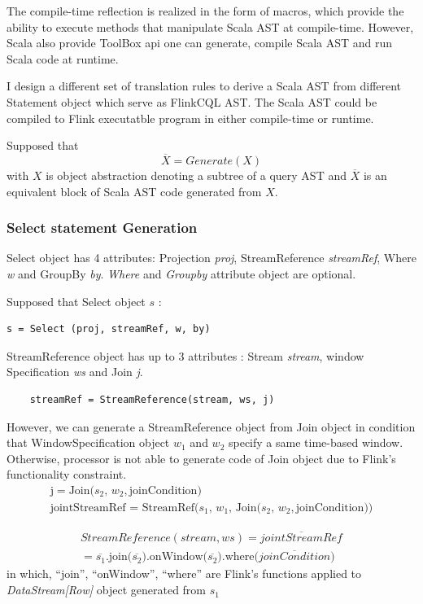 The compile-time reflection is realized in the form of macros, which provide the ability to execute methods that manipulate Scala AST at compile-time. However, Scala also provide ToolBox api one can generate, compile Scala AST and run Scala code at runtime. 

I design a different set of translation rules to derive a Scala AST from different Statement object which serve as FlinkCQL AST. The Scala AST could be compiled to Flink executatble program in either compile-time or runtime.

Supposed that 
\begin{equation}
	\overline{X} = Generate(X)
\end{equation}
 with $X$ is object abstraction denoting a subtree of a query AST and $\overline{X}$ is an equivalent block of Scala AST code generated from $X$.

\subsubsection*{Select statement Generation}
Select object has 4 attributes: Projection \textit{proj}, StreamReference \textit{streamRef}, Where \textit{w} and GroupBy \textit{by}. \textit{Where} and \textit{Groupby} attribute object are optional. 

Supposed that Select object $s$ :
\begin{lstlisting}
s = Select (proj, streamRef, w, by)
\end{lstlisting}

StreamReference object has up to 3 attributes :  Stream \textit{stream}, window Specification \textit{ws} and Join \textit{j}.
\begin{lstlisting}
	streamRef = StreamReference(stream, ws, j)
\end{lstlisting}

However, we can generate a StreamReference object from Join object in condition that WindowSpecification object $w_1$ and $w_2$ specify a same time-based window. Otherwise, processor is not able to generate code of Join object due to Flink's functionality constraint.
\begin{align}
	\textrm{j} = \textrm{Join(}s_2,\, w_2, \textrm{joinCondition)} \\
	\textrm{jointStreamRef = StreamRef(}s_1,\, w_1,\, \textrm{Join(}s_2,\, w_2, \textrm{joinCondition))}
\end{align}

\begin{multline}
StreamReference(stream, ws) = \overline{jointStreamRef} \\
= \overline{  s_1}\textrm{.join(}\overline{s_2})\textrm{.onWindow(}\overline{s_2}\textrm{).where(}\overline{joinCondition}\textrm{)}
\end{multline}
in which, ``join'', ``onWindow'', ``where'' are Flink's functions applied to  \textit{DataStream[Row]} object generated from $s_1$

